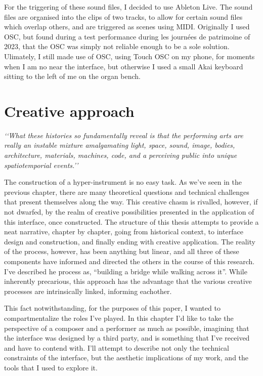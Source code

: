 \documentclass[12pt,twoside,maitrise]{dms_ks}
\theoremstyle{definition}
\begin{document}
{For the triggering of these sound files, I decided to use Ableton Live. 
The sound files are organised into the clips of two tracks, to allow for certain sound files which overlap others, and are triggered as scenes using MIDI. 
Originally I used OSC, but found during a test performance during les journées de patrimoine of 2023, that the OSC was simply not reliable enough to be a sole solution. 
Ulimately, I still made use of OSC, using Touch OSC on my phone, for moments when I am no near the interface, but otherwise I used a small Akai keyboard sitting to the left of me on the organ bench.

\chapter{Creative approach}

\epigraph{\textit{‘‘What these histories so fundamentally reveal is that the performing arts are really an instable mixture amalgamating light, space, sound, image, bodies, architecture, materials, machines, code, and a perceiving public into unique spatiotemporial events.’’}\footnotemark}{}

The construction of a hyper-instrument is no easy task.
As we've seen in the previous chapter, there are many theoretical questions and technical challenges that present themselves along the way.
This creative chasm is rivalled, however, if not dwarfed, by the realm of creative possibilities presented in the application of this interface, once constructed.
The structure of this thesis attempts to provide a neat narrative, chapter by chapter, going from historical context, to interface design and construction, and finally ending with creative application.
The reality of the process, however, has been anything but linear, and all three of these components have informed and directed the others in the course of this research.
I’ve described he process as, “building a bridge while walking across it”.
While inherently precarious, this approach has the advantage that the various creative processes are intrinsically linked, informing eachother.

This fact notwithstanding, for the purposes of this paper, I wanted to compartmentalize the roles I’ve played.
In this chapter I’d like to take the perspective of a composer and a performer as much as possible, imagining that the interface was designed by a third party, and is something that I’ve received and have to contend with.
I’ll attempt to describe not only the technical constraints of the interface, but the aesthetic implications of my work, and the tools that I used to explore it.

}
\end{document}
